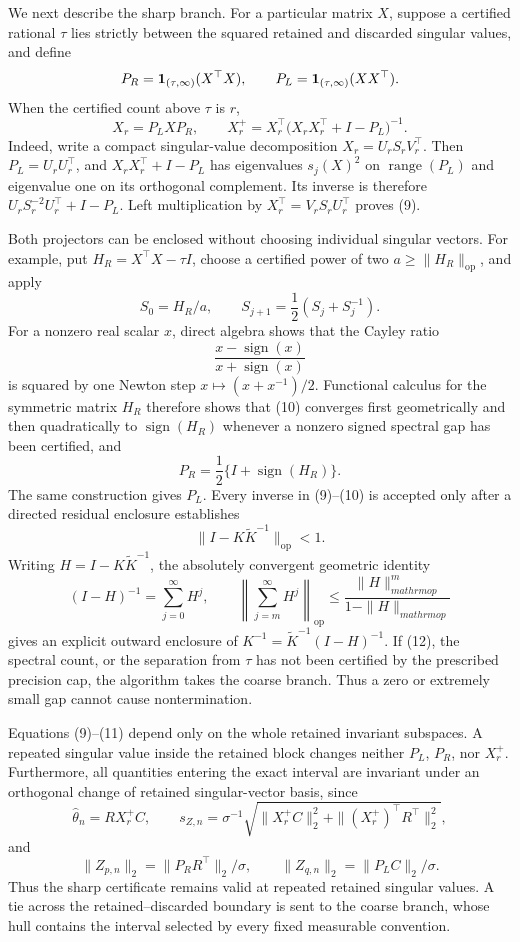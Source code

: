 We next describe the sharp branch. For a particular matrix \(X\), suppose a certified rational \(\tau\) lies strictly between the squared retained and discarded singular values, and define
\[
P_R={\bf 1}_{(\tau,\infty)}(X^{\top}X),
\qquad
P_L={\bf 1}_{(\tau,\infty)}(XX^{\top}).
\]
When the certified count above \(\tau\) is \(r\),
\[
X_r=P_LXP_R,
\qquad
X_r^+=X_r^{\top}
\bigl(X_rX_r^{\top}+I-P_L\bigr)^{-1}.
\tag{9}
\]
Indeed, write a compact singular-value decomposition \(X_r=U_rS_rV_r^{\top}\). Then \(P_L=U_rU_r^{\top}\), and \(X_rX_r^{\top}+I-P_L\) has eigenvalues \(s_j(X)^2\) on \(\operatorname{range}(P_L)\) and eigenvalue one on its orthogonal complement. Its inverse is therefore \(U_rS_r^{-2}U_r^{\top}+I-P_L\). Left multiplication by \(X_r^{\top}=V_rS_rU_r^{\top}\) proves (9).

Both projectors can be enclosed without choosing individual singular vectors. For example, put \(H_R=X^{\top}X-\tau I\), choose a certified power of two \(a\ge\|H_R\|_{\mathrm{op}}\), and apply
\[
S_0=H_R/a,
\qquad
S_{j+1}=\frac12(S_j+S_j^{-1}).
\tag{10}
\]
For a nonzero real scalar \(x\), direct algebra shows that the Cayley ratio
\[
\frac{x-\operatorname{sign}(x)}{x+\operatorname{sign}(x)}
\]
is squared by one Newton step \(x\mapsto(x+x^{-1})/2\). Functional calculus for the symmetric matrix \(H_R\) therefore shows that (10) converges first geometrically and then quadratically to \(\operatorname{sign}(H_R)\) whenever a nonzero signed spectral gap has been certified, and
\[
P_R=\frac12\{I+\operatorname{sign}(H_R)\}.
\tag{11}
\]
The same construction gives \(P_L\). Every inverse in (9)--(10) is accepted only after a directed residual enclosure establishes
\[
\|I-K\widetilde K^{-1}\|_{\mathrm{op}}<1.
\tag{12}
\]
Writing \(H=I-K\widetilde K^{-1}\), the absolutely convergent geometric identity
\[
(I-H)^{-1}=\sum_{j=0}^{\infty}H^j,
\qquad
\left\|\sum_{j=m}^{\infty}H^j\right\|_{\mathrm{op}}
\le\frac{\|H\|_{mathrm{op}}^m}{1-\|H\|_{mathrm{op}}}
\tag{13}
\]
gives an explicit outward enclosure of \(K^{-1}=\widetilde K^{-1}(I-H)^{-1}\). If (12), the spectral count, or the separation from \(\tau\) has not been certified by the prescribed precision cap, the algorithm takes the coarse branch. Thus a zero or extremely small gap cannot cause nontermination.

Equations (9)--(11) depend only on the whole retained invariant subspaces. A repeated singular value inside the retained block changes neither \(P_L\), \(P_R\), nor \(X_r^+\). Furthermore, all quantities entering the exact interval are invariant under an orthogonal change of retained singular-vector basis, since
\[
\widehat\theta_n=RX_r^+C,
\qquad
s_{Z,n}=\sigma^{-1}
\sqrt{\|X_r^+C\|_2^2+
\|(X_r^+)^{\top}R^{\top}\|_2^2},
\tag{14}
\]
and
\[
\|Z_{p,n}\|_2=\|P_RR^{\top}\|_2/\sigma,
\qquad
\|Z_{q,n}\|_2=\|P_LC\|_2/\sigma.
\tag{15}
\]
Thus the sharp certificate remains valid at repeated retained singular values. A tie across the retained--discarded boundary is sent to the coarse branch, whose hull contains the interval selected by every fixed measurable convention.


